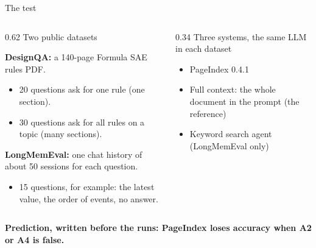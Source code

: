\documentclass[aspectratio=169,11pt]{beamer}
\newcommand{\lbl}[1]{{\color{Mute}\fontsize{9.5}{12}\selectfont #1}\par}
\newcommand{\callout}[1]{{\fontsize{12}{15.5}\selectfont\color{Ink}\bfseries #1\par}}
\begin{document}
\begin{frame}{The test}
  \vspace{0.15cm}
  \begin{columns}[T,onlytextwidth]
    \begin{column}{0.62\textwidth}
      \lbl{Two public datasets}
      \vspace{0.04cm}
      {\fontsize{10.5}{13.5}\selectfont
      \textbf{DesignQA:} a 140-page Formula SAE rules PDF.
      \begin{itemize}\setlength{\itemsep}{1pt}
        \item 20 questions ask for one rule (one section).
        \item 30 questions ask for all rules on a topic (many sections).
      \end{itemize}
      \vspace{0.10cm}
      \textbf{LongMemEval:} one chat history of about 50 sessions for each question.
      \begin{itemize}\setlength{\itemsep}{1pt}
        \item 15 questions, for example: the latest value, the order of events, no answer.
      \end{itemize}\par}
    \end{column}
    \begin{column}{0.34\textwidth}
      \lbl{Three systems, the same LLM in each dataset}
      \vspace{0.06cm}
      {\fontsize{10.5}{13.5}\selectfont
      \begin{itemize}\setlength{\itemsep}{3pt}
        \item PageIndex 0.4.1
        \item Full context: the whole document in the prompt (the reference)
        \item Keyword search agent (LongMemEval only)
      \end{itemize}\par}
    \end{column}
  \end{columns}
  \vspace{0.25cm}
  \callout{Prediction, written before the runs: PageIndex loses accuracy when A2 or A4 is false.}
\end{frame}
\end{document}
